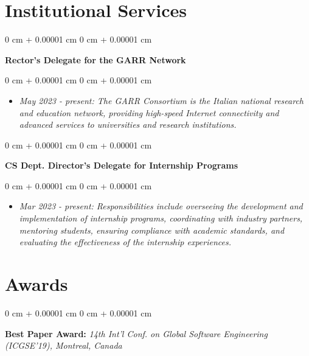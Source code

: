 \documentclass[10pt, a4paper]{article}
\newenvironment{highlights}{
    \begin{itemize}[
        topsep=0.10 cm,
        parsep=0.10 cm,
        partopsep=0pt,
        itemsep=0pt,
        leftmargin=0 cm + 10pt
    ]
}{
    \end{itemize}
} %
\newenvironment{onecolentry}{
    \begin{adjustwidth}{
        0 cm + 0.00001 cm
    }{
        0 cm + 0.00001 cm
    }
}{
    \end{adjustwidth}
} %
\begin{document}
    
    \section{Institutional Services}



        
        \begin{onecolentry}
            \textbf{Rector’s Delegate for the GARR Network}\end{onecolentry}

        \vspace{0.10 cm}
        \begin{onecolentry}
            \begin{highlights}
                \item \textit{May 2023 - present: The GARR Consortium is the Italian national research and education network, providing high-speed Internet connectivity and advanced services to universities and research institutions.}
            \end{highlights}
        \end{onecolentry}


        \vspace{0.2 cm}

        \begin{onecolentry}
            \textbf{CS Dept. Director’s Delegate for Internship Programs}\end{onecolentry}

        \vspace{0.10 cm}
        \begin{onecolentry}
            \begin{highlights}
                \item \textit{Mar 2023 - present: Responsibilities include overseeing the development and implementation of internship programs, coordinating with industry partners, mentoring students, ensuring compliance with academic standards, and evaluating the effectiveness of the internship experiences.}
            \end{highlights}
        \end{onecolentry}



    
    \section{Awards}



        
        \begin{onecolentry}
            \textbf{Best Paper Award:} \textit{14th Int'l Conf. on Global Software Engineering (ICGSE'19), Montreal, Canada}
        \end{onecolentry}
\end{document}
